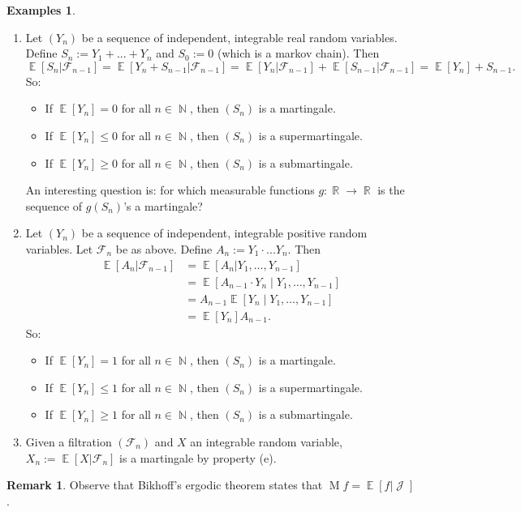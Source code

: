 \documentclass[12pt,a4paper]{report}
\theoremstyle{definition}
\newtheorem*{examples}{Examples}
\newtheorem*{remark}{Remark}
\theoremstyle{num.custom-title}
\DeclareMathOperator{\E}{\mathbb{E}}
\DeclareMathOperator{\J}{\mathcal{J}}
\DeclareMathOperator{\N}{\mathbb{N}}
\DeclareMathOperator{\R}{\mathbb{R}}
\newcommand{\F}{\mathcal{F}}
\renewcommand{\1}{\mathbbm{1}}
\begin{document}
\begin{examples}\ 
	\begin{enumerate}
		\item Let $(Y_n)$ be a sequence of independent, integrable real random variables. Define $S_n := Y_1 + ... + Y_n$ and $S_0 := 0$ (which is a markov chain). Then
		\[
		\E[S_n|\F_{n-1}] = \E[Y_n + S_{n-1} | \F_{n-1}] = \E[Y_n|\F_{n-1}] + \E[S_{n-1}|\F_{n-1}] = \E[Y_n]+S_{n-1}.
		\]
		So:
		\begin{itemize}
			\item If $\E[Y_n]=0$ for all $n \in \N$, then $(S_n)$ is a martingale.
			\item If $\E[Y_n] \leq 0$ for all $n \in \N$, then $(S_n)$ is a supermartingale.
			\item If $\E[Y_n] \geq 0$ for all $n \in \N$, then $(S_n)$ is a submartingale.
		\end{itemize}
		An interesting question is: for which measurable functions $g \colon \R \to \R$ is the sequence of $g(S_n)$'s a martingale?
		\item Let $(Y_n)$ be a sequence of independent, integrable positive random variables. Let $\F_n$ be as above. Define $A_n := Y_1 \cdot ... Y_n$. Then
		\begin{align*}
		\E[A_n|\F_{n-1}]
		&= \E[A_n | Y_1, \ldots, Y_{n-1}] \\
		&= \E[A_{n-1} \cdot Y_n \mid Y_1, \ldots, Y_{n-1}] \\
		&= A_{n-1} \E[Y_n \mid Y_1,\ldots,Y_{n-1}] \tag{by (d)} \\
		&= \E[Y_n] A_{n-1}.
		\end{align*}
		So:
		\begin{itemize}
			\item If $\E[Y_n]=1$ for all $n \in \N$, then $(S_n)$ is a martingale.
			\item If $\E[Y_n] \leq 1$ for all $n \in \N$, then $(S_n)$ is a supermartingale.
			\item If $\E[Y_n] \geq 1$ for all $n \in \N$, then $(S_n)$ is a submartingale.
		\end{itemize}
		\item Given a filtration $(\F_n)$ and $X$ an integrable random variable, $X_n := \E[X|\F_n]$ is a martingale by property (e).
	\end{enumerate}
\end{examples}

\begin{remark}
	Observe that Bikhoff's ergodic theorem states that $\operatorname{M} f = \E[f | \J]$.
\end{remark}
\end{document}
